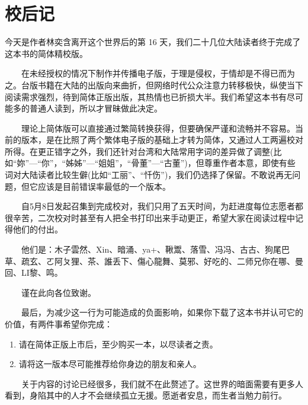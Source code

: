 \documentclass[12pt,UTF8]{ctexbook}
\begin{document}
\hypertarget{jiaohouji}{%
\chapter*{校后记}\label{jiaohouji}}

今天是作者林奕含离开这个世界后的第 16 天，我们二十几位大陆读者终于完成了这本书的简体精校版。

　　在未经授权的情况下制作并传播电子版，于理是侵权，于情却是不得已而为之。台版书籍在大陆的出版向来曲折，但网络时代公众注意力转移极快，纵使当下阅读需求强烈，待到简体正版出版，其热情也已折损大半。我们希望这本书有尽可能多的普通人读到，所以才冒昧做此决定。

　　理论上简体版可以直接通过繁简转换获得，但要确保严谨和流畅并不容易。当前的版本，是在比照了两个繁体电子版的基础上才转为简体，又通过人工两遍校对所得。在更正错字之外，我们还针对台湾和大陆常用字词的差异做了调整(比如\enquote{妳}---\enquote{你}，\enquote{姊姊}---\enquote{姐姐}，\enquote{骨董}---\enquote{古董})，但尊重作者本意，即使有些词对大陆读者比较生僻(比如\enquote{工丽}、\enquote{忏伤})，我们仍选择了保留。不敢说再无问题，但它应该是目前错误率最低的一个版本。

　　自5月8日发起召集到完成校对，我们只用了五天时间，为赶进度每位志愿者都很辛苦，二次校对时甚至有人把全书打印出来手动更正，希望大家在阅读过程中记得他们的付出。

　　他们是：木子雲然、Xin、暗涌、ya+、鞦鬻、落雪、冯冯、古古、狗尾巴草、疏玄、ㄛ阿ㄆ狸、茶、誰丢下、傷心龍舞、莫邪、好吃的、二师兄你在哪、曼回、LI黎、鸣。

　　谨在此向各位致谢。

　　最后，为减少这一行为可能造成的负面影响，如果你下载了这本书并认可它的价值，有两件事希望你完成：

\begin{enumerate}
\def\labelenumi{\arabic{enumi}.}
\item
  请在简体正版上市后，至少购买一本，以尽读者之责。
\item
  请将这一版本尽可能推荐给你身边的朋友和亲人。
\end{enumerate}

　　关于内容的讨论已经很多，我们就不在此赘述了。这世界的暗面需要有更多人看到，身陷其中的人才不会继续孤立无援。愿逝者安息，而生者当勉力前行。


\end{document}
